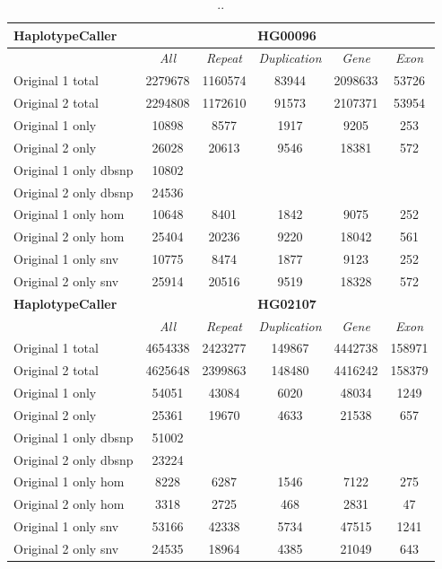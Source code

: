 \begin{table}[htb]
\begin{center}
\begin{tabular}{|l|c||c|c|c|c|}
\hline
{\bf HaplotypeCaller} & \multicolumn{5}{|c|}{\bf HG00096} \\
\hline
\cline{2-6}
{\bf} & {\it All} & {\it Repeat} & {\it Duplication} & {\it Gene} & {\it Exon} \\
\hline
Original 1 total & 2279678 & 1160574 & 83944 & 2098633 & 53726\\ 
\hline
Original 2 total & 2294808 & 1172610 & 91573 & 2107371 & 53954\\ 
\hline
Original 1 only & 10898 & 8577 & 1917 & 9205 & 253\\ 
\hline
Original 2 only & 26028 & 20613 & 9546 & 18381 & 572\\ 
\hline
Original 1 only dbsnp & 10802 &  &  &  & \\ 
\hline
Original 2 only dbsnp & 24536 &  &  &  & \\ 
\hline
Original 1 only hom & 10648 & 8401 & 1842 & 9075 & 252\\ 
\hline
Original 2 only hom & 25404 & 20236 & 9220 & 18042 & 561\\ 
\hline
Original 1 only snv & 10775 & 8474 & 1877 & 9123 & 252\\ 
\hline
Original 2 only snv & 25914 & 20516 & 9519 & 18328 & 572\\ 
\hline
\hline
{\bf HaplotypeCaller} & \multicolumn{5}{|c|}{\bf HG02107} \\
\hline
\cline{2-6}
{\bf} & {\it All} & {\it Repeat} & {\it Duplication} & {\it Gene} & {\it Exon} \\
\hline
Original 1 total & 4654338 & 2423277 & 149867 & 4442738 & 158971\\ 
\hline
Original 2 total & 4625648 & 2399863 & 148480 & 4416242 & 158379\\ 
\hline
Original 1 only & 54051 & 43084 & 6020 & 48034 & 1249\\ 
\hline
Original 2 only & 25361 & 19670 & 4633 & 21538 & 657\\ 
\hline
Original 1 only dbsnp & 51002 &  &  &  & \\ 
\hline
Original 2 only dbsnp & 23224 &  &  &  & \\ 
\hline
Original 1 only hom & 8228 & 6287 & 1546 & 7122 & 275\\ 
\hline
Original 2 only hom & 3318 & 2725 & 468 & 2831 & 47\\ 
\hline
Original 1 only snv & 53166 & 42338 & 5734 & 47515 & 1241\\ 
\hline
Original 2 only snv & 24535 & 18964 & 4385 & 21049 & 643\\ 
\hline 
\end{tabular}
\end{center}
\caption{ .. }
\label{tab:orig-vs-shuf-hc}
\end{table}



